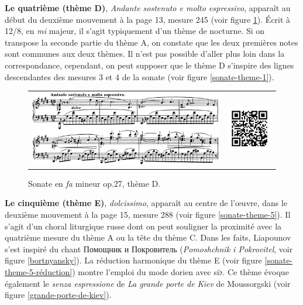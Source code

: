 \textbf{Le quatrième (thème D)}, \emph{Andante sostenuto e molto espressivo}, apparaît au début du deuxième mouvement à la page 13, mesure 245 (voir figure \ref{sonate-theme-4}). Écrit à 12/8, en \emph{mi} majeur, il s'agit typiquement d'un thème de nocturne. Si on transpose la seconde partie du thème A, on constate que les deux premières notes sont communes aux deux thèmes. Il n'est pas possible d'aller plus loin dans la correspondance, cependant, on peut supposer que le thème D s'inspire des lignes descendantes des mesures 3 et 4 de la sonate (voir figure \ref{sonate-theme-1}).

\begin{figure}[!ht]
  \begin{bigcenter}
    \begin{tabular}{lr}
      \includegraphics[width=12.5cm, keepaspectratio]{sonate-theme-D.png}
      &
      \includegraphics[width=3cm, keepaspectratio]{op1-qr.png}
    \end{tabular}
  \end{bigcenter}
  \caption{\label{sonate-theme-4}Sonate en \emph{fa} mineur op.27, thème D.}
\end{figure}

\textbf{Le cinquième (thème E)}, \emph{dolcissimo},  apparaît au centre de l'œuvre, dans le deuxième mouvement à la page 15, mesure 288 (voir figure \ref{sonate-theme-5}). Il s'agit d'un choral liturgique russe dont on peut souligner la proximité avec la quatrième mesure du thème A ou la tête du thème C. Dans les faits, Liapounov s'est inspiré du chant \foreignlanguage{russian}{Помощник и Покровитель} (\emph{Pomoshchnik i Pokrovitel}, voir figure \ref{bortnyansky}). La réduction harmonique du thème E (voir figure \ref{sonate-theme-5-réduction}) montre l'emploi du mode dorien avec si$\flat$. Ce thème évoque également le \emph{senza espressione} de \emph{La grande porte de Kiev} de Moussorgski (voir figure \ref{grande-porte-de-kiev}).\\

